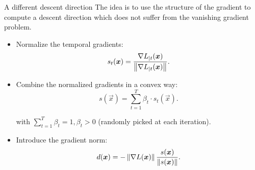 \begin{frame}{A different descent direction}
	The idea is to use the structure of the gradient to compute a descent direction which does not suffer from the vanishing gradient problem.
\begin{itemize}
	\item Normalize the temporal gradients:
	\begin{equation}
	s_t(\boldsymbol{x}) = \frac{\nabla L_{|t}(\boldsymbol{x})}{\left\Vert \nabla L_{|t}(\boldsymbol{x}) \right\Vert}.
	\end{equation}
	
	\item Combine the normalized gradients in a convex way:
	\begin{equation}
	s(\vec{x}) = \sum_{t=1}^T \beta_t \cdot s_t(\vec{x}).
	\end{equation}
	
	with $\sum_{t=1}^T\beta_t=1, \beta_t>0$ (randomly picked at each iteration).
	\item Introduce the gradient norm:
	\begin{equation}
	d(\boldsymbol{x}) = - \left\Vert \nabla L (\boldsymbol{x}) \right\Vert\frac{s(\boldsymbol{x})}{\left\Vert s(\boldsymbol{x}) \right\Vert}.
	\end{equation}
\end{itemize}
\end{frame}

